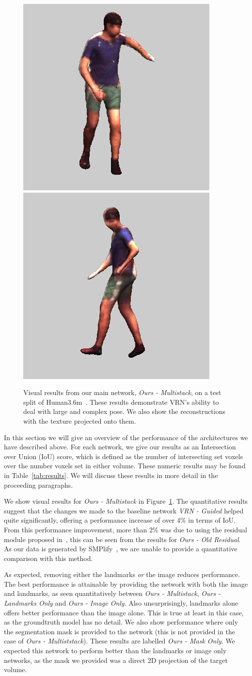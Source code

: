 \begin{figure}
\includegraphics[width=0.2\linewidth]{img/results/multistack-textured/S11WalkTogether_1_60457274_mp4_frame00026__max200_pad25_jpg.png}
\includegraphics[width=0.2\linewidth]{img/results/multistack-textured/S11WalkTogether_1_60457274_mp4_frame00031__max200_pad25_jpg.png}
\caption[Visual results from our main architecture]{Visual results
  from our main network, \textit{Ours - Multistack}, on a test split
  of Human3.6m~\cite{h36m_pami}. These results demonstrate VRN's
  ability to deal with large and complex pose. We also show the
  reconstructions with the texture projected onto them.}
\label{fig:visres_ours}
\end{figure}


In this section we will give an overview of the performance of the
architectures we have described above. For each network, we give our
results as an Intersection over Union (IoU) score, which is defined as
the number of intersecting set voxels over the number voxels set in
either volume. These numeric results may be found in
Table~\ref{tab:results}. We will discuss these results in more detail
in the proceeding paragraphs.

We show visual results for \textit{Ours - Multistack} in
Figure~\ref{fig:visres_ours}. The quantitative results suggest that
the changes we made to the baseline network \textit{VRN - Guided}
helped quite significantly, offering a performance increase of over
4\% in terms of IoU. From this performance improvement, more than 2\%
was due to using the residual module proposed
in~\cite{bulat2017binarized}, this can be seen from the results for
\textit{Ours - Old Residual}. As our data is generated by
SMPlify~\cite{bogo2016smplify}, we are unable to provide a
quantitative comparison with this method.

As expected, removing either the landmarks \textit{or} the image
reduces performance. The best performance is attainable by providing
the network with both the image and landmarks, as seen quantitatively
between \textit{Ours - Multistack}, \textit{Ours - Landmarks Only} and
\textit{Ours - Image Only}. Also unsurprisingly, landmarks alone
offers better performance than the image alone. This is true at least
in this case, as the groundtruth model has no detail. We also show
performance where only the segmentation mask is provided to the
network (this is not provided in the case of \textit{Ours -
  Multiststack}). These results are labelled \textit{Ours - Mask
  Only}. We expected this network to perform better than the landmarks
or image only networks, as the mask we provided was a direct 2D
projection of the target volume.



